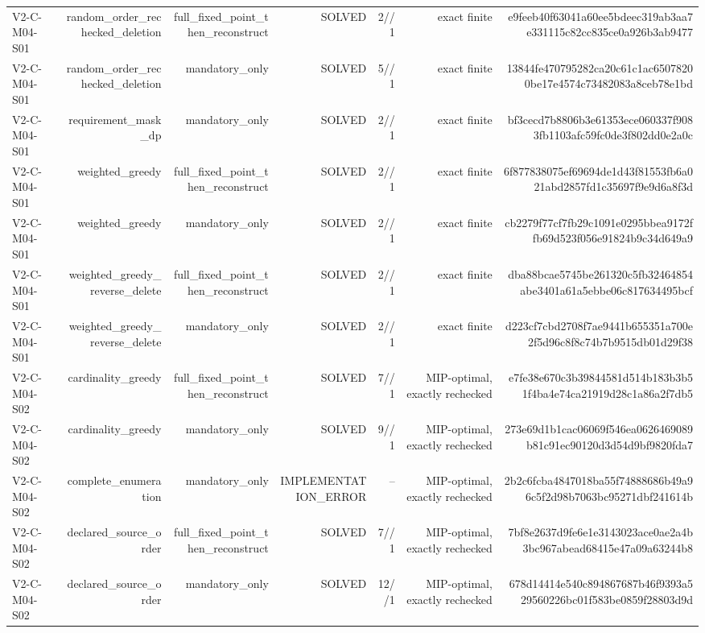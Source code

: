 {\begin{longtable}{lrrrrrr}
V2-C-M04-S01 & random\_order\_rechecked\_deletion & full\_fixed\_point\_then\_reconstruct & SOLVED & 2//1 & exact finite & e9feeb40f63041a60ee5bdeec319ab3aa7e331115c82cc835ce0a926b3ab9477 \\
V2-C-M04-S01 & random\_order\_rechecked\_deletion & mandatory\_only & SOLVED & 5//1 & exact finite & 13844fe470795282ca20c61c1ac65078200be17e4574c73482083a8ceb78e1bd \\
V2-C-M04-S01 & requirement\_mask\_dp & mandatory\_only & SOLVED & 2//1 & exact finite & bf3cecd7b8806b3e61353ece060337f9083fb1103afc59fc0de3f802dd0e2a0c \\
V2-C-M04-S01 & weighted\_greedy & full\_fixed\_point\_then\_reconstruct & SOLVED & 2//1 & exact finite & 6f877838075ef69694de1d43f81553fb6a021abd2857fd1c35697f9e9d6a8f3d \\
V2-C-M04-S01 & weighted\_greedy & mandatory\_only & SOLVED & 2//1 & exact finite & cb2279f77cf7fb29c1091e0295bbea9172ffb69d523f056e91824b9c34d649a9 \\
V2-C-M04-S01 & weighted\_greedy\_reverse\_delete & full\_fixed\_point\_then\_reconstruct & SOLVED & 2//1 & exact finite & dba88bcae5745be261320c5fb32464854abe3401a61a5ebbe06c817634495bcf \\
V2-C-M04-S01 & weighted\_greedy\_reverse\_delete & mandatory\_only & SOLVED & 2//1 & exact finite & d223cf7cbd2708f7ae9441b655351a700e2f5d96c8f8c74b7b9515db01d29f38 \\
V2-C-M04-S02 & cardinality\_greedy & full\_fixed\_point\_then\_reconstruct & SOLVED & 7//1 & MIP-optimal, exactly rechecked & e7fe38e670c3b39844581d514b183b3b51f4ba4e74ca21919d28c1a86a2f7db5 \\
V2-C-M04-S02 & cardinality\_greedy & mandatory\_only & SOLVED & 9//1 & MIP-optimal, exactly rechecked & 273e69d1b1cac06069f546ea0626469089b81c91ec90120d3d54d9bf9820fda7 \\
V2-C-M04-S02 & complete\_enumeration & mandatory\_only & IMPLEMENTATION\_ERROR & -- & MIP-optimal, exactly rechecked & 2b2c6fcba4847018ba55f74888686b49a96c5f2d98b7063bc95271dbf241614b \\
V2-C-M04-S02 & declared\_source\_order & full\_fixed\_point\_then\_reconstruct & SOLVED & 7//1 & MIP-optimal, exactly rechecked & 7bf8e2637d9fe6e1e3143023ace0ae2a4b3bc967abead68415e47a09a63244b8 \\
V2-C-M04-S02 & declared\_source\_order & mandatory\_only & SOLVED & 12//1 & MIP-optimal, exactly rechecked & 678d14414e540c894867687b46f9393a529560226bc01f583be0859f28803d9d \\

\end{longtable}}
